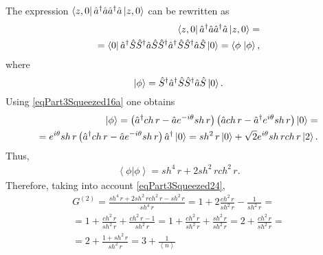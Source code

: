 The expression
$\bra{z,0}\hat{a}^{\dag}\hat{a}\hat{a}^{\dag}\hat{a}\ket{z,0}$
can be rewritten as
\begin{eqnarray}
  \bra{z,0}\hat{a}^{\dag}\hat{a}\hat{a}^{\dag}\hat{a}\ket{z,0}
  = \nonumber \\
  =
  \bra{0}\hat{a}^{\dag}\hat{S}\hat{S}^{\dag}\hat{a}\hat{S}\hat{S}^{\dag}\hat{a}^{\dag}\hat{S}\hat{S}^{\dag}\hat{a}\hat{S}\ket{0}
  = \left<\phi\right.\left|\phi\right>,
  \nonumber
\end{eqnarray}
where
\[
\left|\phi\right> = \hat{S}^{\dag}\hat{a}^{\dag}\hat{S}\hat{S}^{\dag}\hat{a}\hat{S}\ket{0}.
\]
Using \eqref{eqPart3Squeezed16a} one obtains
\begin{eqnarray}
  \left|\phi\right> =  
  \left(\hat{a}^{\dag} ch\,r - \hat{a} e^{-i\theta} sh \, r\right)
  \left(\hat{a} ch\,r - \hat{a}^{\dag} e^{i\theta} sh \, r\right)
  \ket{0} =
  \nonumber \\
  =
   e^{i\theta} sh \, r \left(\hat{a}^{\dag} ch\,r - \hat{a} e^{-i\theta} sh \, r\right)
   \hat{a}^{\dag}\ket{0} =
   sh^2 \, r \ket{0} + \sqrt{2} e^{i\theta}  sh \, r ch \, r\ket{2}.
  \nonumber
\end{eqnarray}
Thus,
\begin{eqnarray}
  \left<\phi\right.\left|\phi\right> =
  sh^4 \, r + 2 sh^2 \, r ch^2 \, r.
  \nonumber
\end{eqnarray}
Therefore, taking into account \eqref{eqPart3Squeezed24},
\begin{eqnarray}
G^{(2)} = \frac{sh^4 \, r + 2 sh^2 \, r ch^2 \, r - sh^2 \, r}{sh^4 \,
  r} = 1 + 2 \frac{ch^2 \, r}{sh^2 \, r} - \frac{1}{sh^2 \, r} =
\nonumber \\
=
1 + \frac{ch^2 \, r}{sh^2 \, r} + \frac{ch^2 \, r - 1}{sh^2 \, r} =
1 + \frac{ch^2 \, r}{sh^2 \, r} + \frac{sh^2 \, r }{sh^2 \, r} =
2 + \frac{ch^2 \, r}{sh^2 \, r} =
\nonumber \\
= 2 + \frac{1 + sh^2 \, r}{sh^2 \, r} = 3 + \frac{1}{\left<n\right>}
\nonumber
\end{eqnarray}